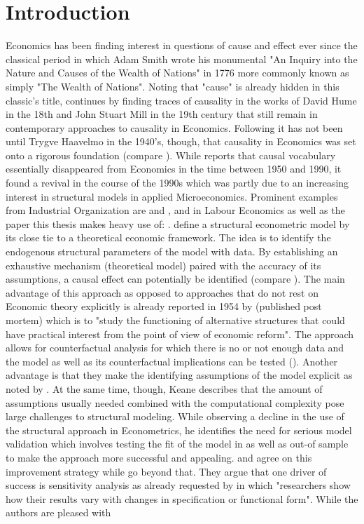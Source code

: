 \section{Introduction}
\thispagestyle{plain} %

Economics has been finding interest in questions of cause and effect ever since the classical period in which Adam Smith wrote his monumental "An Inquiry into the Nature and Causes of the Wealth of Nations" in 1776 more commonly known as simply "The Wealth of Nations". Noting that "cause" is already hidden in this classic's title, \cite{Hoover.2008} continues by finding traces of causality in the works of David Hume in the 18th and John Stuart Mill in the 19th century that still remain in contemporary approaches to causality in Economics. Following \cite{Heckman.2013} it has not been until Trygve Haavelmo in the 1940's, though, that causality in Economics was set onto a rigorous foundation (compare \cite{Haavelmo.1943, Haavelmo.1944}). While \cite{Hoover.2008} reports that causal vocabulary essentially disappeared from Economics in the time between 1950 and 1990, it found a revival in the course of the 1990s which was partly due to an increasing interest in structural models in applied Microeconomics. Prominent examples from Industrial Organization are \cite{Berry.1995} and \cite{Goldberg.1995}, \cite{Keane.1994} and \cite{Keane.1997} in Labour Economics as well as the paper this thesis makes heavy use of: \cite{Rust.1987}. \cite{Low.2017} define a structural econometric model by its close tie to a theoretical economic framework. The idea is to identify the endogenous structural parameters of the model with data. By establishing an exhaustive mechanism (theoretical model) paired with the accuracy of its assumptions, a causal effect can potentially be identified (compare \cite{Morgan.2015}). The main advantage of this approach as opposed to approaches that do not rest on Economic theory explicitly is already reported in 1954 by \cite{Haavelmo.2015} (published post mortem) which is to "study the functioning of alternative structures that could have practical interest from the point of view of economic reform". The approach allows for counterfactual analysis for which there is no or not enough data and the model as well as its counterfactual implications can be tested (\cite{Low.2017}). Another advantage is that they make the identifying assumptions of the model explicit as noted by \cite{Keane.2010}. At the same time, though, Keane describes that the amount of assumptions usually needed combined with the computational complexity pose large challenges to structural modeling. While observing a decline in the use of the structural approach in Econometrics, he identifies the need for serious model validation which involves testing the fit of the model in as well as out-of sample to make the approach more successful and appealing. \cite{Rust.2014} and \cite{Wolpin.2013} agree on this improvement strategy while \cite{Angrist.2010} go beyond that. They argue that one driver of success is sensitivity analysis as already requested by \cite{Leamer.1983} in which "researchers show how their results vary with changes in specification or functional form". While the authors are pleased with 